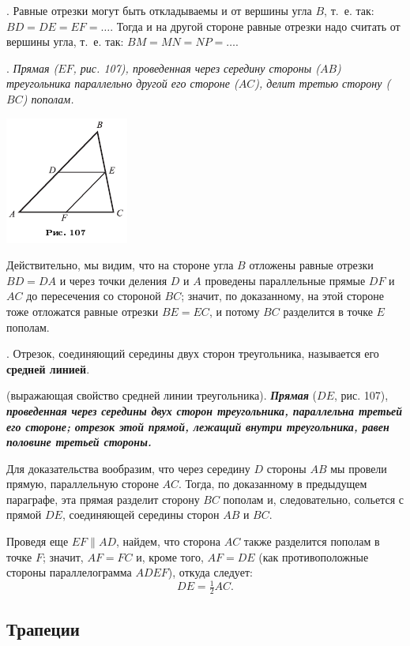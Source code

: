 \documentclass[oneside]{book}
\begin{document}
.
Равные отрезки могут быть откладываемы и от вершины угла $B$, т.~е.
так:
$BD=DE= EF=\dots$.
Тогда и на другой стороне равные отрезки надо считать от вершины угла, т.~е. так:
$BM=MN=NP=\dots$.

.
\emph{Прямая \emph{($EF$, рис. 107),} проведенная через середину стороны ($AB$) треугольника параллельно другой его стороне ($AC$), делит третью сторону ($BC$) пополам.}

\includegraphics{pics/ris-107}

Действительно, мы видим, что на стороне угла $B$ отложены равные отрезки $BD=DA$ и через точки деления $D$ и $A$ проведены параллельные прямые $DF$ и $AC$ до пересечения со стороной $BC$;
значит, по доказанному, на этой стороне тоже отложатся равные отрезки $BE=EC$, и потому $BC$ разделится в точке $E$ пополам.

.
Отрезок, соединяющий середины двух сторон треугольника, называется его \textbf{средней линией}.

 (выражающая свойство средней линии треугольника).
\textbf{\emph{Прямая}} ($DE$, рис. 107), \textbf{\emph{проведенная через середины двух сторон треугольника, параллельна третьей его стороне;
отрезок этой прямой, лежащий внутри треугольника, равен половине третьей стороны.}}

Для доказательства вообразим, что через середину $D$ стороны $AB$ мы провели прямую, параллельную стороне $AC$.
Тогда, по доказанному в предыдущем параграфе, эта прямая разделит сторону $BC$ пополам и, следовательно, сольется с прямой $DE$, соединяющей середины сторон $AB$ и $BC$.

Проведя еще $EF \parallel AD$, найдем, что сторона $AC$ также разделится пополам в точке $F$;
значит, $AF=FC$ и, кроме того, $AF=DE$
(как противоположные стороны параллелограмма $ADEF$), откуда следует:
\[DE=\tfrac12AC.\]

\subsection*{Трапеции}
\end{document}
